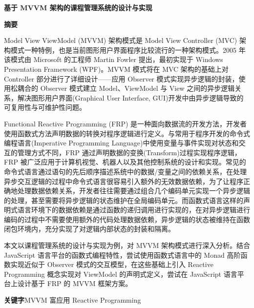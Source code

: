 \begin{center}
	\heiti{}\textbf{基于 MVVM 架构的课程管理系统的设计与实现}
\end{center}
\begin{center}
	\heiti{}\textbf{摘\quad 要}
\end{center}
\vspace{2.5mm}
\songti{}

Model View ViewModel (MVVM) 架构模式是 Model View Controller (MVC) 架构模式一种特例，也是当前图形用户界面程序比较流行的一种架构模式。2005 年该模式由 Microsoft 的工程师 Martin Fowler 提出，最初实现于 Windows Presentation Framework (WPF)。MVVM 模式将在 MVC 架构的基础上对 Controller 部分进行了详细设计——应用 Observer 模式实现异步逻辑的封装，使用松耦合的 Observer 模式建立 Model、ViewModel 与 View 之间的异步逻辑关系，解决图形用户界面(Graphical User Interface, GUI)开发中由异步逻辑导致的可复用性与可维护性问题。

Functional Reactive Programming (FRP) 是一种面向数据流的开发方法，开发者使用函数式方法声明数据的转换对程序逻辑进行定义。与常用于程序开发的命令式编程语言(Imperative Programming Language)中使用变量与事件实现对状态和交互的管理方式不同，FRP 通过声明数据的变换(Transform)过程实现程序逻辑，FRP 被广泛应用于计算机视觉、机器人以及其他控制系统的设计和实现。常见的命令式语言通过语句的先后顺序描述系统中的数据/变量之间的依赖关系，在处理异步交互逻辑的过程中命令式语言很容易引入额外的无效数据依赖，为了让程序正确地处理数据依赖关系，开发者往往需要通过组合几个编码单元实现一个异步逻辑的处理，甚至需要将异步逻辑的状态维护在全局编码单元。而函数式语言这样的声明式语言环境下的数据依赖是通过函数的递归调用进行实现的，在对异步逻辑进行编码的过程中不需要使用额外的代码处理数据依赖，异步逻辑的状态被维持在函数闭包环境内，充分实现了对逻辑内部状态的封装和隔离。

本文以课程管理系统的设计与实现为例，对 MVVM 架构模式进行深入分析。结合 JavaScript 语言平台的函数式编程特性，尝试使用函数式语言中的 Monad 高阶函数实现近似于 Observer 模式的交互模型，在这些基础上引入 Reactive Programming 概念实现对 ViewModel 的声明式定义，尝试在 JavaScript 语言平台上设计基于 FRP 的 MVVM 框架方案。

\vspace{3mm}
\heiti\textbf{关键字}\quad \songti MVVM \quad 富应用 \quad Reactive Programming

